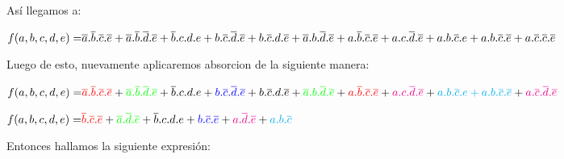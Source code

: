 \noindent
As\'i llegamos a:\vspace{8mm}\par

$
\color{black}{f(a,b,c,d,e) =}  \overline{a}.\overline{b}.\overline{c}.\overline{e} \color{black}+
\vspace{5mm}\overline{a}.\overline{b}.\overline{d}.\overline{e} \color{black}+ \overline{b}.c.d.e \color{black}+ b.\overline{c}.\overline{d}.\overline{e} \color{black}+ b.\overline{c}.d.\overline{e} \color{black}+ \overline{a}.b.\overline{d}.\overline{e} \color{black}+ a.\overline{b}.\overline{c}.\overline{e} \color{black}+ a.c.\overline{d}.\overline{e} \color{black}+ a.b.\overline{c}.e \color{black}+ a.b.\overline{c}.\overline{e} \color{black}+ a.\overline{c}.\overline{c}.\overline{e}$
\vspace{8mm}\par

\noindent
Luego de esto, nuevamente aplicaremos absorcion de la siguiente manera:\vspace{8mm}\par

$
\color{black}{f(a,b,c,d,e) =}  \color{red}{\overline{a}.\overline{b}.\overline{c}.\overline{e}} \color{black}+
\vspace{5mm}\color{green}{\overline{a}.\overline{b}.\overline{d}.\overline{e}} \color{black}+ \color{black}{\overline{b}.c.d.e} \color{black}+ \color{blue}{b.\overline{c}.\overline{d}.\overline{e} \color{black}+ b.\overline{c}.d.\overline{e}} \color{black}+ \color{green}{\overline{a}.b.\overline{d}.\overline{e}} \color{black}+ \color{red}{a.\overline{b}.\overline{c}.\overline{e}} \color{black}+ \color{magenta}{a.c.\overline{d}.\overline{e}} \color{black}+ \color{cyan}{a.b.\overline{c}.e + a.b.\overline{c}.\overline{e}} \color{black}+ \color{magenta}{a.\overline{c}.\overline{d}.\overline{e}}$
\vspace{8mm}\par
$
\color{black}{f(a,b,c,d,e) =}  \color{red}{\overline{b}.\overline{c}.\overline{e}} \color{black}+ \color{green}{\overline{a}.\overline{d}.\overline{e}} \color{black}+ \color{black}{\overline{b}.c.d.e} \color{black}+ \color{blue}{b.\overline{c}.\overline{e}} \color{black}+ \color{magenta}{a.\overline{d}.\overline{e}} \color{black}+ \color{cyan}{a.b.\overline{c}}$
\vspace{8mm}\par

Entonces hallamos la siguiente expresi\'on:\vspace{8mm}\par

